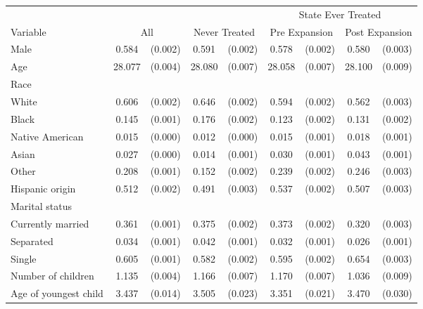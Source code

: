 \begin{tabular}{lcccccccc}
\toprule
\toprule
  & & & & & \multicolumn{4}{c}{State Ever Treated} \\
 Variable & \multicolumn{2}{c}{All} & \multicolumn{2}{c}{Never Treated} & \multicolumn{2}{c}{Pre Expansion} & \multicolumn{2}{c}{Post Expansion} \\
\midrule 
 Male   & 0.584 & (0.002)  & 0.591 & (0.002)  & 0.578 & (0.002)  & 0.580 & (0.003)  \\
 Age   & 28.077 & (0.004)  & 28.080 & (0.007)  & 28.058 & (0.007)  & 28.100 & (0.009)  \\
 Race   & & & & & \\
 \hspace{0.3cm}  White   & 0.606 & (0.002)  & 0.646 & (0.002)  & 0.594 & (0.002)  & 0.562 & (0.003)  \\
 \hspace{0.3cm}  Black   & 0.145 & (0.001)  & 0.176 & (0.002)  & 0.123 & (0.002)  & 0.131 & (0.002)  \\
 \hspace{0.3cm}  Native American   & 0.015 & (0.000)  & 0.012 & (0.000)  & 0.015 & (0.001)  & 0.018 & (0.001)  \\
 \hspace{0.3cm}  Asian   & 0.027 & (0.000)  & 0.014 & (0.001)  & 0.030 & (0.001)  & 0.043 & (0.001)  \\
 \hspace{0.3cm}  Other   & 0.208 & (0.001)  & 0.152 & (0.002)  & 0.239 & (0.002)  & 0.246 & (0.003)  \\
 Hispanic origin   & 0.512 & (0.002)  & 0.491 & (0.003)  & 0.537 & (0.002)  & 0.507 & (0.003)  \\
 Marital status   & & & & & \\
 \hspace{0.3cm} Currently married   & 0.361 & (0.001)  & 0.375 & (0.002)  & 0.373 & (0.002)  & 0.320 & (0.003)  \\
 \hspace{0.3cm} Separated   & 0.034 & (0.001)  & 0.042 & (0.001)  & 0.032 & (0.001)  & 0.026 & (0.001)  \\
 \hspace{0.3cm} Single   & 0.605 & (0.001)  & 0.582 & (0.002)  & 0.595 & (0.002)  & 0.654 & (0.003)  \\
 Number of children   & 1.135 & (0.004)  & 1.166 & (0.007)  & 1.170 & (0.007)  & 1.036 & (0.009)  \\
 Age of youngest child   & 3.437 & (0.014)  & 3.505 & (0.023)  & 3.351 & (0.021)  & 3.470 & (0.030)  \\

\end{tabular}
